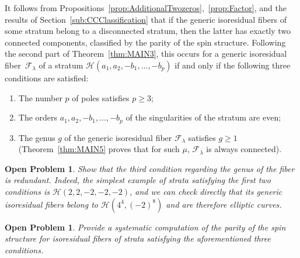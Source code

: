 \documentclass[JEP,XML,SOM,Unicode,NoFloatCountersInSection,published]{cedram}
\newtheorem{opprob}[thm]{Open Problem}
\theoremstyle{definition}
\begin{document}
It follows from Propositions~\ref{prop:AdditionalTwozeros},~\ref{prop:Factor}, and the results of Section~\ref{sub:CCClassification} that if the generic isoresidual fibers of some stratum belong to a disconnected stratum, then the latter has exactly two connected components, classified by the parity of the spin structure. Following the second part of Theorem~\ref{thm:MAIN3}, this occurs for a generic isoresidual fiber~$\mathcal{F}_{\lambda}$ of a stratum $\mathcal{H}(a_{1},a_{2},-b_{1},\dots,-b_{p})$ if and only if the following three conditions are satisfied:
\begin{enumerate}
\item The number $p$ of poles satisfies $p \geq 3$;
\item The orders $a_{1},a_{2},-b_{1},\dots,-b_{p}$ of the singularities of the stratum are even;
\item The genus $g$ of the generic isoresidual fiber $\mathcal{F}_{\lambda}$ satisfies $g \geq 1$ (Theorem~\ref{thm:MAIN5} proves that for such $\mu$, $\mathcal{F}_{\lambda}$ is always connected).
\end{enumerate}

\begin{opprob}
Show that the third condition regarding the genus of the fiber is redundant. Indeed, the simplest example of strata satisfying the first two conditions is $\mathcal{H}(2,2,-2,-2,-2)$, and we can check directly that its generic isoresidual fibers belong to $\mathcal{H}(4^{4},(-2)^{8})$ and are therefore elliptic curves.
\end{opprob}

\begin{opprob}
Provide a systematic computation of the parity of the spin structure for isoresidual fibers of strata satisfying the aforementioned three conditions.
\end{opprob}

\backmatter


\end{document}
